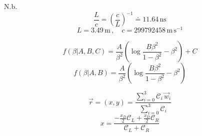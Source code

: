 \documentclass{article}
\begin{document}
N.b.
$$ \frac{L}{c} = \left( \frac{c}{L} \right)^{-1} \doteq 11.64\,\mathrm{ns}$$
$$ L = 3.49\, \mathrm{m}\,, \quad c = 299792458\, \mathrm{m}\,\mathrm{s}^{-1}$$

\clearpage

$$ f(\beta|A,B,C) = \frac{A}{\beta^2} \left( \log \frac{B\beta^2}{{1-\beta^2}} - \beta^2 \right) + C $$
$$ f(\beta|A,B) = \frac{A}{\beta^2} \left( \log \frac{B\beta^2}{{1-\beta^2}} - \beta^2 \right)$$


$$ \vec{r} = (x,y) = \frac{ \sum\limits_{i=0}^3  \mathcal{C}_i \, \vec{w}_i }{\sum\limits_{i=0}^3  \mathcal{C}_i}$$
$$ x = \frac{ -\frac{x_D}{2} \mathcal{C}_L + \frac{x_D}{2} \mathcal{C}_R }{\mathcal{C}_L + \mathcal{C}_R}$$
\end{document}
